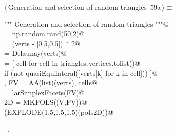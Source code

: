 \documentclass[11pt,oneside]{article}    %
\begin{document}
\begin{flushleft} \small \label{scrap114}
\protect{}$\langle\,$Generation and selection of random triangles\nobreak\ {\footnotesize 59a}$\,\rangle\equiv$
\vspace{-1ex}
\begin{list}{}{} \item
\mbox{}\verb@""" Generation and selection of random triangles """@\\
\mbox{}\verb@verts = np.random.rand(50,2)@\\
\mbox{}\verb@verts = (verts - [0.5,0.5]) * 2@\\
\mbox{}\verb@triangles = Delaunay(verts)@\\
\mbox{}\verb@cells = [ cell for cell in triangles.vertices.tolist()@\\
\mbox{}\verb@         if (not quasiEquilateral([verts[k] for k in cell])) ]@\\
\mbox{}\verb@V, FV = AA(list)(verts), cells@\\
\mbox{}\verb@EV = larSimplexFacets(FV)@\\
\mbox{}\verb@pols2D = MKPOLS((V,FV))@\\
\mbox{}\verb@VIEW(EXPLODE(1.5,1.5,1.5)(pols2D))@\\
\mbox{}\verb@@{\NWsep}
\end{list}
\vspace{-1ex}
\footnotesize\addtolength{\baselineskip}{-1ex}
\begin{list}{}{\setlength{\itemsep}{-\parsep}\setlength{\itemindent}{-\leftmargin}}
\item \NWtxtMacroRefIn\ .
\end{list}
\end{flushleft}
\end{document}
